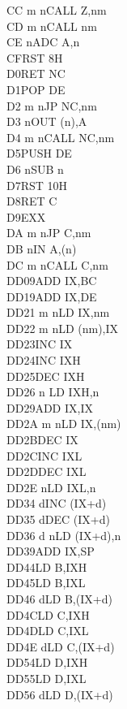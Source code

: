 \documentclass[12pt,twoside,openright,a4paper]{book}
\begin{document}
\begin{multicols}{3}
{\begin{tabbing}
	CC m n\>CALL Z,nm\\
	CD m n\>CALL nm\\
	CE n\>ADC A,n\\
	CF\>RST 8H\\
	D0\>RET NC\\
	D1\>POP DE\\
	D2 m n\>JP NC,nm\\
	D3 n\>OUT (n),A\\
	D4 m n\>CALL NC,nm\\
	D5\>PUSH DE\\
	D6 n\>SUB n\\
	D7\>RST 10H\\
	D8\>RET C\\
	D9\>EXX\\
	DA m n\>JP C,nm\\
	DB n\>IN A,(n)\\
	DC m n\>CALL C,nm\\
	DD09\>ADD IX,BC\\
	DD19\>ADD IX,DE\\
	DD21 m n\>LD IX,nm\\
	DD22 m n\>LD (nm),IX\\
	DD23\>INC IX\\
	DD24\>INC IXH\UNDOC\\
	DD25\>DEC IXH\UNDOC\\
	DD26 n \>LD IXH,n\UNDOC\\
	DD29\>ADD IX,IX\\
	DD2A m n\>LD IX,(nm)\\
	DD2B\>DEC IX\\
	DD2C\>INC IXL\UNDOC\\
	DD2D\>DEC IXL\UNDOC\\
	DD2E n\>LD IXL,n\UNDOC\\
	DD34 d\>INC (IX+d)\\
	DD35 d\>DEC (IX+d)\\
	DD36 d n\>LD (IX+d),n\\
	DD39\>ADD IX,SP\\
	DD44\>LD B,IXH\UNDOC\\
	DD45\>LD B,IXL\UNDOC\\
	DD46 d\>LD B,(IX+d)\\
	DD4C\>LD C,IXH\UNDOC\\
	DD4D\>LD C,IXL\UNDOC\\
	DD4E d\>LD C,(IX+d)\\
	DD54\>LD D,IXH\UNDOC\\
	DD55\>LD D,IXL\UNDOC\\
	DD56 d\>LD D,(IX+d)\\

\end{tabbing}}
\end{multicols}
\end{document}
